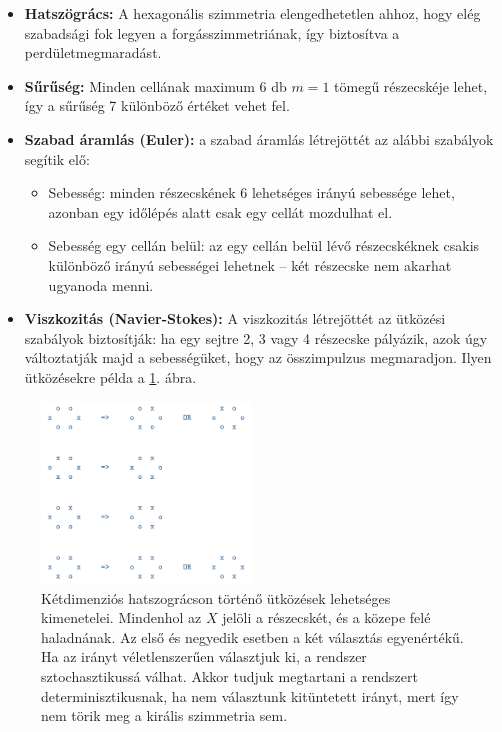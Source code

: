 \documentclass[12pt]{article}
\theoremstyle{plain}
\begin{document}
\begin{itemize}
\item \textbf{Hatszögrács:} A hexagonális szimmetria elengedhetetlen ahhoz, hogy elég szabadsági fok legyen a forgásszimmetriának, így biztosítva a perdületmegmaradást.
\item \textbf{Sűrűség:} Minden cellának maximum 6 db $m=1$ tömegű részecskéje lehet, így a sűrűség 7 különböző értéket vehet fel.
\item \textbf{Szabad áramlás (Euler):} a szabad áramlás létrejöttét az alábbi szabályok segítik elő:
\begin{itemize}
\item Sebesség: minden részecskének 6 lehetséges irányú sebessége lehet, azonban egy időlépés alatt csak egy cellát mozdulhat el. 
\item Sebesség egy cellán belül: az egy cellán belül lévő részecskéknek csakis különböző irányú sebességei lehetnek -- két részecske nem akarhat ugyanoda menni.
\end{itemize}
\item \textbf{Viszkozitás (Navier-Stokes):} A viszkozitás létrejöttét	az ütközési szabályok biztosítják: ha egy sejtre 2, 3 vagy 4 részecske pályázik, azok úgy változtatják majd a sebességüket, hogy az összimpulzus megmaradjon. Ilyen ütközésekre példa a \ref{fig:hexalattice}. ábra.

\end{itemize}

	
\begin{figure}[H]
    \begin{center}
    \includegraphics[width=0.5\textwidth]{media/hexalattice.png}
    \caption{Kétdimenziós hatszográcson történő ütközések lehetséges kimenetelei. Mindenhol az $X$ jelöli a részecskét, és a közepe felé haladnának. Az első és negyedik esetben a két választás egyenértékű. Ha az irányt véletlenszerűen választjuk ki, a rendszer sztochasztikussá válhat. Akkor tudjuk megtartani a rendszert determinisztikusnak, ha nem választunk kitüntetett irányt, mert így nem törik meg a királis szimmetria sem.}
    \label{fig:hexalattice}
    \end{center}
\end{figure}
\end{document}
